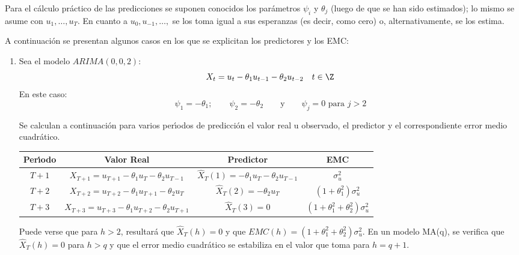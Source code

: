 \begin{observacion}
Para el c\'{a}lculo pr\'{a}ctico de las predicciones se suponen conocidos los par\'{a}metros $\psi_{i} $ y $\theta _{j} $ (luego de que se han sido estimados); lo mismo se asume con $u_{1} ,\ldots,u_{T} .$ En cuanto a $u_{0} ,u_{-1} ,\ldots,$ se los toma igual a sus esperanzas (es decir, como cero) o, alternativamente, se los estima.
\end{observacion}


\begin{ejemplo}
A continuaci\'{o}n se presentan algunos casos en los que se explicitan los 
predictores y los EMC:

\begin{enumerate}
\item Sea el modelo $ARIMA (0, 0, 2)$:
\[
X_{t} =u_{t} -\theta_{1} u_{t-1} -\theta_{2} u_{t-2} 
\quad
t\in \Z
\]
En este caso:
\[
 \psi_{1} =-\theta_{1} ;
\qquad
\psi_{2} =-\theta_{2}\qquad \text{y}\qquad \psi_{j} =0 \text{ para }j>2
\]

Se calculan a continuaci\'{o}n para varios per\'{\i}odos de predicci\'{o}n 
el valor real u observado, el predictor y el correspondiente error medio 
cuadr\'{a}tico.

\begin{center}\small
\begin{tabular}{@{}cccc@{}}
\toprule
\textbf{Per\'{\i}odo}& \textbf{Valor Real}& \textbf{Predictor}& \textbf{EMC} \\
\midrule
$T+1$& $X_{T+1} =u_{T+1} -\theta_{1} u_{T} -\theta_{2} u_{T-1} $& $\widehat{X}_{T} (1)=-\theta_{1} u_{T} -\theta_{2} u_{T-1} $& $\sigma_{u}^{2} $ \\[5pt]
$T+2$& $X_{T+2} =u_{T+2} -\theta_{1} u_{T+1} -\theta_{2} u_{T} $& $\widehat{X}_{T} (2)=-\theta_{2} u{ }_{T}$& $\left( {1+\theta_{1}^{2} } \right)\sigma_{u}^{2} $ \\[5pt]
$T+3$& $X_{T+3} =u_{T+3} -\theta_{1} u_{T+2} -\theta_{2} u_{T+1} $& $\widehat{X}_{T} (3)=0$& $\left( {1+\theta_{1}^{2} +\theta_{2}^{2} } \right)\sigma_{u}^{2} $ \\
\bottomrule
\end{tabular}
\end{center}

Puede verse que para $h>2$, resultar\'{a} que $\widehat{X}_{T} (h)=0$ y que $EMC(h)=\left( {1+\theta_{1}^{2} +\theta_{2}^{2} } \right)\sigma_{u}^{2} $. En un modelo MA(q), se verifica que $\widehat{X}_{T} (h)=0$ para $h > q$ y que el error medio cuadr\'{a}tico se estabiliza en el valor que toma para $h=q+1.$


\end{enumerate}
\end{ejemplo}
